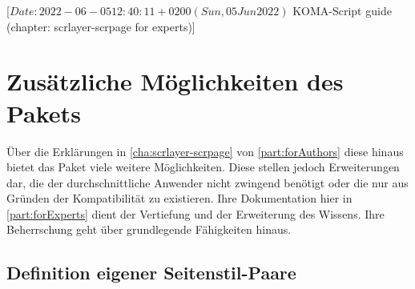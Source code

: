 %
%
%
%
%
%
%

%
                 [$Date: 2022-06-05 12:40:11 +0200 (Sun, 05 Jun 2022) $
                  KOMA-Script guide (chapter: scrlayer-scrpage for experts)]

\chapter[{Zusätzliche Möglichkeiten von \Package{scrlayer-scrpage}}]
{Zusätzliche Möglichkeiten des
  Pakets
  }
%
\BeginIndexGroup
{}%
Über die Erklärungen in \autoref{cha:scrlayer-scrpage} von
\autoref{part:forAuthors} diese hinaus bietet
das Paket  viele weitere Möglichkeiten. Diese
stellen jedoch Erweiterungen dar, die der durchschnittliche Anwender
nicht zwingend benötigt oder die nur aus Gründen der Kompatibilität zu
 existieren. Ihre Dokumentation hier in
\autoref{part:forExperts} dient der Vertiefung und der Erweiterung des
Wissens. Ihre Beherrschung geht über grundlegende Fähigkeiten hinaus.


\section{Definition eigener Seitenstil-Paare}

